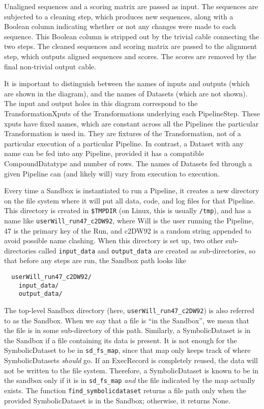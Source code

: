 \documentclass[12pt]{article}
\newcommand{\code}[1]{\texttt{#1}}
\begin{document}
Unaligned sequences and a scoring matrix are passed as input. The sequences
are subjected to a cleaning step, which produces new sequences, along with a
Boolean column indicating whether or not any changes were made to each
sequence. This Boolean column is stripped out by the trivial cable connecting
the two steps. The cleaned sequences and scoring matrix are passed to the
alignment step, which outputs aligned sequences and scores. The scores are
removed by the final non-trivial output cable.

It is important to distinguish between the names of inputs and outputs (which
are shown in the diagram), and the names of Datasets (which are not shown). The
input and output holes in this diagram correspond to the TransformationXputs of
the Transformations underlying each PipelineStep. These xputs have fixed names,
which are constant across all the Pipelines the particular Transformation is
used in. They are fixtures of the Transformation, not of a particular execution
of a particular Pipeline. In contrast, a Dataset with any name can be fed into
any Pipeline, provided it has a compatible CompoundDatatype and number of rows.
The names of Datasets fed through a given Pipeline can (and likely will) vary
from execution to execution.

Every time a Sandbox is instantiated to run a Pipeline, it
creates a new directory on the file system where it will put all data, code,
and log files for that Pipeline. This directory is created in \code{\$TMPDIR}
(on Linux, this is usually \code{/tmp}), and has a name like
\code{userWill\_run47\_c2DW92}, where Will is the user running the Pipeline, 47
is the primary key of the Run, and c2DW92 is a random string appended to avoid
possible name clashing. When this directory is set up, two other
sub-directories called \code{input\_data} and \code{output\_data} are created
as sub-directories, so that before any steps are run, the Sandbox path looks
like
\begin{verbatim}
  userWill_run47_c2DW92/
    input_data/
    output_data/
\end{verbatim}

The top-level Sandbox directory (here, \code{userWill\_run47\_c2DW92}) is also
referred to as the Sandbox. When we say that a file is ``in the Sandbox'', we
mean that the file is in some sub-directory of this path. Similarly, a
SymbolicDataset is in the Sandbox if a file containing its data is present. It
is not enough for the SymbolicDataset to be in \code{sd\_fs\_map}, since that
map only keeps track of where SymbolicDatasets \emph{should} go. If an
ExecRecord is completely reused, the data will not be written to the file
system. Therefore, a SymbolicDataset is known to be in the sandbox only if it
is in \code{sd\_fs\_map} \emph{and} the file indicated by the map actually
exists. The function \code{find\_symbolicdataset} returns a file path only when
the provided SymbolicDataset is in the Sandbox; otherwise, it returns None.
\end{document}
